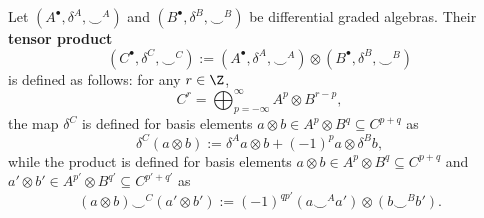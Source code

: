 \begin{definition}
  \label{cmc/differential_graded_algebra/tensor_product-definition}
  Let $(A^\bullet, \delta^A, \smile^A)$ and $(B^\bullet, \delta^B, \smile^B)$ be
  differential graded algebras.
  Their \textbf{tensor product}
  \begin{equation}
    (C^\bullet, \delta^C, \smile^C)
    := (A^\bullet, \delta^A, \smile^A) \otimes (B^\bullet, \delta^B, \smile^B)
  \end{equation}
  is defined as follows: for any $r \in \Z$,
  \begin{equation}
    C^r = \bigoplus_{p = -\infty}^\infty A^p \otimes B^{r - p},
  \end{equation}
  the map $\delta^C$ is defined for basis elements
  $a \otimes b \in A^p \otimes B^q \subseteq C^{p + q}$ as
  \begin{equation}
    \delta^C(a \otimes b)
    := \delta^A a \otimes b + (-1)^p a \otimes \delta^B b,
  \end{equation}
  while the product is defined for basis elements
  $a \otimes b \in A^p \otimes B^q \subseteq C^{p + q}$ and
  $a' \otimes b' \in A^{p'} \otimes B^{q'} \subseteq C^{p' + q'}$
  as
  \begin{equation}
    (a \otimes b) \smile^C (a' \otimes b')
    := (-1)^{q p'} (a \smile^A a') \otimes (b \smile^B b').
  \end{equation}
\end{definition}
